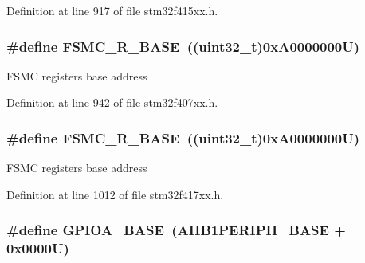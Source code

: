 Definition at line 917 of file stm32f415xx.\+h.

\subsubsection[{\texorpdfstring{F\+S\+M\+C\+\_\+\+R\+\_\+\+B\+A\+SE}{FSMC_R_BASE}}]{\setlength{\rightskip}{0pt plus 5cm}\#define F\+S\+M\+C\+\_\+\+R\+\_\+\+B\+A\+SE~((uint32\+\_\+t)0x\+A0000000\+U)}\hypertarget{group___peripheral__registers__structures_gaddf0e199dccba83272b20c9fb4d3aaed}{}\label{group___peripheral__registers__structures_gaddf0e199dccba83272b20c9fb4d3aaed}
F\+S\+MC registers base address 

Definition at line 942 of file stm32f407xx.\+h.

\subsubsection[{\texorpdfstring{F\+S\+M\+C\+\_\+\+R\+\_\+\+B\+A\+SE}{FSMC_R_BASE}}]{\setlength{\rightskip}{0pt plus 5cm}\#define F\+S\+M\+C\+\_\+\+R\+\_\+\+B\+A\+SE~((uint32\+\_\+t)0x\+A0000000\+U)}\hypertarget{group___peripheral__registers__structures_gaddf0e199dccba83272b20c9fb4d3aaed}{}\label{group___peripheral__registers__structures_gaddf0e199dccba83272b20c9fb4d3aaed}
F\+S\+MC registers base address 

Definition at line 1012 of file stm32f417xx.\+h.

\subsubsection[{\texorpdfstring{G\+P\+I\+O\+A\+\_\+\+B\+A\+SE}{GPIOA_BASE}}]{\setlength{\rightskip}{0pt plus 5cm}\#define G\+P\+I\+O\+A\+\_\+\+B\+A\+SE~({\bf A\+H\+B1\+P\+E\+R\+I\+P\+H\+\_\+\+B\+A\+SE} + 0x0000\+U)}\hypertarget{group___peripheral__registers__structures_gad7723846cc5db8e43a44d78cf21f6efa}{}\label{group___peripheral__registers__structures_gad7723846cc5db8e43a44d78cf21f6efa}



